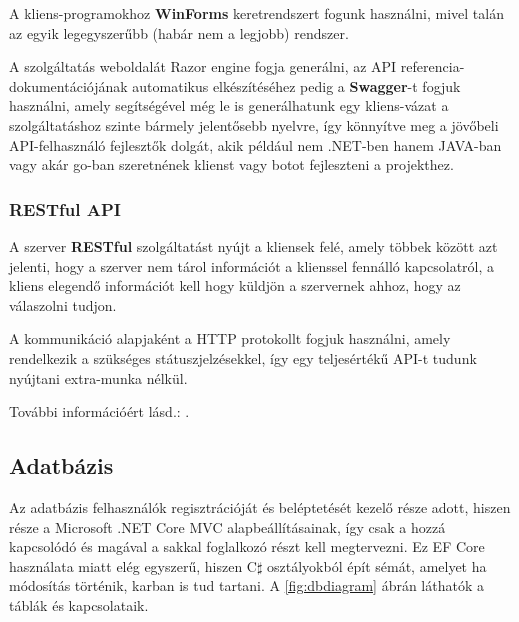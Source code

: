\documentclass[twoside, a4paper, 12pt]{book}
\begin{document}
A kliens-programokhoz \textbf{WinForms} keretrendszert fogunk használni, mivel talán az egyik legegyszerűbb (habár nem a legjobb) rendszer.

A szolgáltatás weboldalát Razor engine fogja generálni, az API referencia-dokumentációjának automatikus elkészítéséhez pedig a \textbf{Swagger}-t fogjuk használni, amely segítségével még le is generálhatunk egy kliens-vázat a szolgáltatáshoz szinte bármely jelentősebb nyelvre, így könnyítve meg a jövőbeli API-felhasználó fejlesztők dolgát, akik például nem .NET-ben hanem JAVA-ban vagy akár go-ban szeretnének klienst vagy botot fejleszteni a projekthez.

\subsubsection{RESTful API}
A szerver \textbf{RESTful} szolgáltatást nyújt a kliensek felé, amely többek között azt jelenti, hogy a szerver nem tárol információt a klienssel fennálló kapcsolatról, a kliens elegendő információt kell hogy küldjön a szervernek ahhoz, hogy az válaszolni tudjon.

A kommunikáció alapjaként a HTTP protokollt fogjuk használni, amely rendelkezik a szükséges státuszjelzésekkel, így egy teljesértékű API-t tudunk nyújtani extra-munka nélkül.

További információért lásd.: \cite{restfulEn}.

\subsection{Adatbázis}
Az adatbázis felhasználók regisztrációját és beléptetését kezelő része adott, hiszen része a Microsoft .NET Core MVC alapbeállításainak, így csak a hozzá kapcsolódó és magával a sakkal foglalkozó részt kell megtervezni. Ez EF Core használata miatt elég egyszerű, hiszen C$\sharp$ osztályokból épít sémát, amelyet ha módosítás történik, karban is tud tartani. A \ref{fig:dbdiagram} ábrán láthatók a táblák és kapcsolataik.
\end{document}
